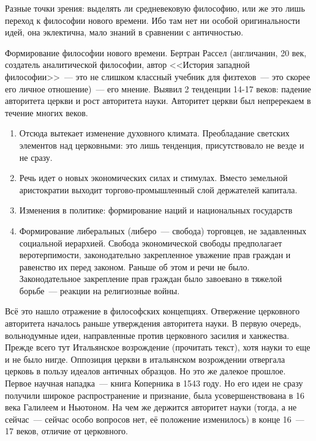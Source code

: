 Разные точки зрения: выделять ли средневековую философию, или же это лишь переход к философии нового времени. Ибо там нет ни особой оригинальности идей, она эклектична, мало знаний в сравнении с античностью.

Формирование философии нового времени.
Бертран Рассел (англичанин, 20 век, создатель аналитической философии, автор <<История западной философии>>~--- это не слишком классный учебник для физтехов~--- это скорее его личное отношение)~--- его мнение.
Выявил 2 тенденции 14-17 веков: падение авторитета церкви и рост авторитета науки. Авторитет церкви был непререкаем в течение многих веков. 

\begin{enumerate}
	\item Отсюда вытекает изменение духовного климата. Преобладание светских элементов над церковными: это лишь тенденция, присутствовало не везде и не сразу. 
	\item Речь идет о новых экономических силах и стимулах. Вместо земельной аристократии выходит торгово-промышленный слой держателей капитала.
	\item Изменения в политике: формирование наций и национальных государств
	\item Формирование либеральных (либеро~--- свобода) торговцев, не задавленных социальной иерархией. Свобода экономической свободы предполагает веротерпимости, законодательно закрепленное уважение прав граждан и равенство их перед законом. Раньше об этом и речи не было. Законодательное закрепление прав граждан было завоевано в тяжелой борьбе~--- реакции на религиозные войны.
\end{enumerate}
Всё это нашло отражение в философских концепциях. Отвержение церковного авторитета началось раньше утверждения авторитета науки. В первую очередь, вольнодумные идеи, направленные против церковного засилия и ханжества. Прежде всего тут Итальянское возрождение (прочитать текст), хотя науки то еще и не было нигде. Оппозиция церкви в итальянском возрождении отвергала церковь в пользу идеалов античных образцов. Но это же далекое прошлое. Первое научная нападка~--- книга Коперника в 1543 году. Но его идеи не сразу получили широкое распространение и признание, была усовершенствована в 16 века Галилеем и Ньютоном. 
На чем же держится авторитет науки (тогда, а не сейчас~--- сейчас особо вопросов нет, её положение изменилось) в конце 16~--- 17 веков, отличие от церковного.

